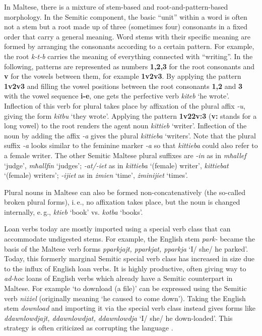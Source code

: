 \documentclass[]{../../metanetpaper}
\begin{document}
\begin{multicols}{2}
In Maltese, there is a mixture of stem-based and root-and-pattern-based morphology. In the Semitic component, the basic ``unit'' within a word is often not a stem but a root made up of three (sometimes four) consonants in a fixed order that carry a general meaning. Word stems with their specific meaning are formed by arranging the consonants according to a certain pattern. For example, the root \emph{k-t-b} carries the meaning of everything connected with ``writing''. In the following, patterns are represented as numbers \textbf{1,2,3} for the root consonants and \textbf{v} for the vowels between them, for example \textbf{1v2v3}. By applying the pattern \textbf{1v2v3} and filling the vowel positions between the root consonants \textbf{1,2} and \textbf{3} with the vowel sequence \textbf{i-e}, one gets the perfective verb \emph{kiteb} `he wrote'. Inflection of this verb for plural takes place by affixation of the plural affix \emph{-u}, giving the form \emph{kitbu} `they wrote'. Applying the pattern \textbf{1v22v:3} (\textbf{v:} stands for a long vowel) to the root renders the agent noun \emph{kittieb} `writer'. Inflection of the noun by adding the affix \emph{-a} gives the plural \emph{kittieba} `writers'. Note that the plural suffix \emph{-a} looks similar to the feminine marker \emph{-a} so that \emph{kittieba} could also refer to a female writer. The other Semitic Maltese plural suffixes are \emph{-in} as in \emph{mħallef} `judge', \emph{mħallfin} `judges'; \emph{-at/-iet} as in \emph{kittieba} `(female) writer', \emph{kittiebat} `(female) writers'; \emph{-ijiet} as in \emph{żmien} `time', \emph{żminijiet} `times'.

Plural nouns in Maltese can also be formed non-concatenatively (the so-called broken plural forms), i.\,e., no affixation takes place, but the noun is changed internally, e.\,g., \emph{ktieb} `book' vs. \emph{kotba} `books'.

Loan verbs today are mostly imported using a special verb class that can accommodate undigested stems. For example, the English stem \emph{park-} became the basis of the Maltese verb forms \emph{pparkjajt, pparkjat, pparkja} `I/ she/ he parked'. Today, this formerly marginal Semitic special verb class has increased in size due to the influx of English loan verbs. It is highly productive, often giving way to \emph{ad-hoc} loans of English verbs which already have a Semitic counterpart in Maltese. For example `to download (a file)' can be expressed using the Semitic verb \emph{niżżel} (originally meaning `he caused to come down'). Taking the English stem \emph{download} and importing it via the special verb class instead gives forms like \emph{ddawnlowdjajt, ddawnlowdjat, ddawnlowdja} `I/ she/ he down-loaded'. This strategy is often criticized as corrupting the language \cite{Fabri:2011a}.


\end{multicols}
\end{document}

